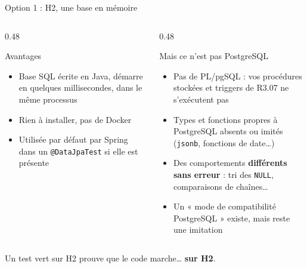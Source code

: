 \documentclass[aspectratio=169,10pt]{beamer}
\begin{document}
\begin{frame}{Option 1 : H2, une base en mémoire}
  \small
  \begin{columns}[T]
    \begin{column}{0.48\textwidth}
      \begin{exampleblock}{Avantages}
        \begin{itemize}
          \item Base SQL écrite en Java, démarre en quelques millisecondes, dans le même processus
          \item Rien à installer, pas de Docker
          \item Utilisée par défaut par Spring dans un \texttt{@DataJpaTest} si elle est présente
        \end{itemize}
      \end{exampleblock}
    \end{column}
    \begin{column}{0.48\textwidth}
      \begin{alertblock}{Mais ce n'est pas PostgreSQL}
        \begin{itemize}
          \item Pas de PL/pgSQL : vos procédures stockées et triggers de R3.07 ne s'exécutent pas
          \item Types et fonctions propres à PostgreSQL absents ou imités (\texttt{jsonb}, fonctions de date\ldots)
          \item Des comportements \textbf{différents sans erreur} : tri des \texttt{NULL}, comparaisons de chaînes\ldots
          \item Un « mode de compatibilité PostgreSQL » existe, mais reste une imitation
        \end{itemize}
      \end{alertblock}
    \end{column}
  \end{columns}
  \vspace{3mm}
  \begin{center}
    Un test vert sur H2 prouve que le code marche\ldots{} \textbf{sur H2}.
  \end{center}
\end{frame}
\end{document}

